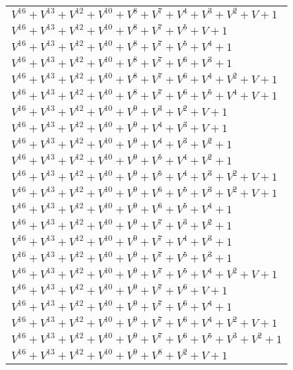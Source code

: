 \documentclass[12pt]{article}
\begin{document}
\begin{adjustwidth}{-4cm}{}
\begin{center}
\begin{longtable}{|l|}
$V^{16}  +V^{13}  +V^{12}  +V^{10}  +V^{8}  +V^{7}  +V^{4}  +V^{3}  +V^{2}  + V + 1$ \\
$V^{16}  +V^{13}  +V^{12}  +V^{10}  +V^{8}  +V^{7}  +V^{5}  + V + 1$ \\
$V^{16}  +V^{13}  +V^{12}  +V^{10}  +V^{8}  +V^{7}  +V^{5}  +V^{4}  + 1$ \\
$V^{16}  +V^{13}  +V^{12}  +V^{10}  +V^{8}  +V^{7}  +V^{6}  +V^{3}  + 1$ \\
$V^{16}  +V^{13}  +V^{12}  +V^{10}  +V^{8}  +V^{7}  +V^{6}  +V^{4}  +V^{2}  + V + 1$ \\
$V^{16}  +V^{13}  +V^{12}  +V^{10}  +V^{8}  +V^{7}  +V^{6}  +V^{5}  +V^{4}  + V + 1$ \\
$V^{16}  +V^{13}  +V^{12}  +V^{10}  +V^{9}  +V^{3}  +V^{2}  + V + 1$ \\
$V^{16}  +V^{13}  +V^{12}  +V^{10}  +V^{9}  +V^{4}  +V^{3}  + V + 1$ \\
$V^{16}  +V^{13}  +V^{12}  +V^{10}  +V^{9}  +V^{4}  +V^{3}  +V^{2}  + 1$ \\
$V^{16}  +V^{13}  +V^{12}  +V^{10}  +V^{9}  +V^{5}  +V^{4}  +V^{2}  + 1$ \\
$V^{16}  +V^{13}  +V^{12}  +V^{10}  +V^{9}  +V^{5}  +V^{4}  +V^{3}  +V^{2}  + V + 1$ \\
$V^{16}  +V^{13}  +V^{12}  +V^{10}  +V^{9}  +V^{6}  +V^{5}  +V^{3}  +V^{2}  + V + 1$ \\
$V^{16}  +V^{13}  +V^{12}  +V^{10}  +V^{9}  +V^{6}  +V^{5}  +V^{4}  + 1$ \\
$V^{16}  +V^{13}  +V^{12}  +V^{10}  +V^{9}  +V^{7}  +V^{3}  +V^{2}  + 1$ \\
$V^{16}  +V^{13}  +V^{12}  +V^{10}  +V^{9}  +V^{7}  +V^{4}  +V^{3}  + 1$ \\
$V^{16}  +V^{13}  +V^{12}  +V^{10}  +V^{9}  +V^{7}  +V^{5}  +V^{3}  + 1$ \\
$V^{16}  +V^{13}  +V^{12}  +V^{10}  +V^{9}  +V^{7}  +V^{5}  +V^{4}  +V^{2}  + V + 1$ \\
$V^{16}  +V^{13}  +V^{12}  +V^{10}  +V^{9}  +V^{7}  +V^{6}  + V + 1$ \\
$V^{16}  +V^{13}  +V^{12}  +V^{10}  +V^{9}  +V^{7}  +V^{6}  +V^{4}  + 1$ \\
$V^{16}  +V^{13}  +V^{12}  +V^{10}  +V^{9}  +V^{7}  +V^{6}  +V^{4}  +V^{2}  + V + 1$ \\
$V^{16}  +V^{13}  +V^{12}  +V^{10}  +V^{9}  +V^{7}  +V^{6}  +V^{5}  +V^{3}  +V^{2}  + 1$ \\
$V^{16}  +V^{13}  +V^{12}  +V^{10}  +V^{9}  +V^{8}  +V^{2}  + V + 1$ \\

\end{longtable}
\end{center}
\end{adjustwidth}
\end{document}
